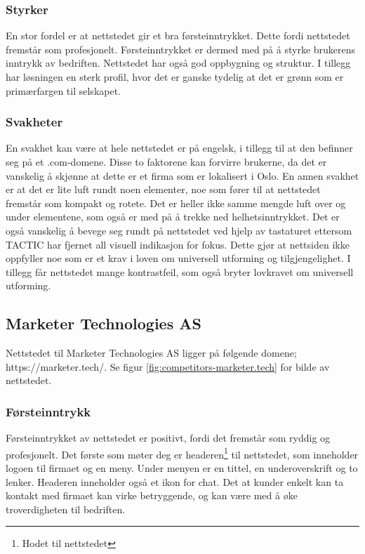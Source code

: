 \subsubsection{Styrker}
En stor fordel er at nettstedet gir et bra førsteinntrykket. Dette fordi nettstedet fremstår som profesjonelt. Førsteinntrykket er dermed med på å styrke brukerens inntrykk av bedriften. Nettstedet har også god oppbygning og struktur. I tillegg har løsningen en sterk profil, hvor det er ganske tydelig at det er grønn som er primærfargen til selskapet.

\subsubsection{Svakheter}
En svakhet kan være at hele nettstedet er på engelsk, i tillegg til at den befinner seg på et .com-domene. Disse to faktorene kan forvirre brukerne, da det er vanskelig å skjønne at dette er et firma som er lokalisert i Oslo. En annen svakhet er at det er lite luft rundt noen elementer, noe som fører til at nettstedet fremstår som kompakt og rotete. Det er heller ikke samme mengde luft over og under elementene, som også er med på å trekke ned helhetsinntrykket. Det er også vanskelig å bevege seg rundt på nettstedet ved hjelp av tastaturet ettersom TACTIC har fjernet all visuell indikasjon for fokus. Dette gjør at nettsiden ikke oppfyller noe som er et krav i loven om universell utforming og tilgjengelighet. I tillegg får nettstedet mange kontrastfeil, som også bryter lovkravet om universell utforming.

\subsection{Marketer Technologies AS}
Nettstedet til Marketer Technologies AS ligger på følgende domene;
https://marketer.tech/. Se figur \ref{fig:competitors-marketer.tech} for bilde av nettstedet.

\subsubsection{Førsteinntrykk}
Førsteinntrykket av nettstedet er positivt, fordi det fremstår som ryddig og profesjonelt. Det første som møter deg er headeren\footnote{Hodet til nettstedet} til nettstedet, som inneholder logoen til firmaet og en meny. Under menyen er en tittel, en underoverskrift og to lenker. Headeren inneholder også et ikon for chat. Det at kunder enkelt kan ta kontakt med firmaet kan virke betryggende, og kan være med å øke troverdigheten til bedriften.

